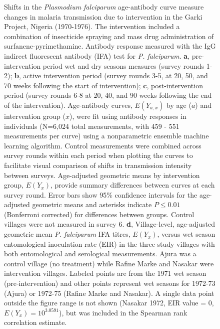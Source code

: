 \documentclass[11pt]{article}
\begin{document}
\begin{figure}[htbp]
\begin{center}
\begin{minipage}{\textwidth}
\caption{Shifts in the \textit{Plasmodium falciparum} age-antibody curve measure changes in malaria transmission due to intervention in the Garki Project, Nigeria (1970-1976). The intervention included a combination of insecticide spraying and mass drug administration of surfanene-pyrimethamine. Antibody response measured with the IgG indirect fluorescent antibody (IFA) test for \textit{P. falciparum}. \textbf{a}, pre-intervention period wet and dry seasons measures (survey rounds 1-2); \textbf{b}, active intervention period (survey rounds 3-5, at 20, 50, and 70 weeks following the start of intervention); \textbf{c}, post-intervention period (survey rounds 6-8 at 20, 40, and 90 weeks following the end of the intervention).  Age-antibody curves, $E(Y_{a,x})$ by age ($a$) and intervention group ($x$), were fit using antibody responses in individuals (N=6,024 total measurements, with 459 - 551 measurements per curve) using a nonparametric ensemble machine learning algorithm. Control measurements were combined across survey rounds within each period when plotting the curves to facilitate visual comparison of shifts in transmission intensity between surveys. Age-adjusted geometric means by intervention group, $E(Y_x)$, provide summary differences between curves at each survey round. Error bars show 95\% confidence intervals for the age-adjusted geometric means and asterisks indicate $P\leq0.01$ (Bonferroni corrected) for differences between groups. Control villages were not measured in survey 6. \textbf{d}, Village-level, age-adjusted geometric mean \textit{P. falciparum} IFA titres, $E(Y_x)$, versus wet season entomological inoculation rate (EIR) in the three study villages with both entomological and serological measurements. Ajura was a control village (no treatment) while Rafine Marke and Nasakar were intervention villages.  Labeled points are from the 1971 wet season (pre-intervention) and other points represent wet seasons for 1972-73 (Ajura) or 1972-75 (Rafine Marke and Nasakar). A single data point outside the figure range is not shown (Nasakar 1972, EIR value = 0, $E(Y_x) = 10^{3.0591}$), but was included in the Spearman rank correlation estimate.  }
\label{fig:garki}
\end{minipage}
\end{center}
\end{figure}
\end{document}
